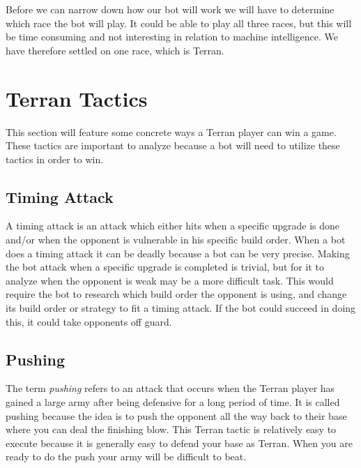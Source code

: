 Before we can narrow down how our bot will work we will have to determine which race the bot will play. It could be able to play all three races, but 
this will be time consuming and not interesting in relation to machine intelligence. We have therefore settled on one race, which is Terran.

\section{Terran Tactics}
	This section will feature some concrete ways a Terran player can win a game. 
	These tactics are important to analyze because a bot will need to utilize these tactics in order to win.
	
	\subsection{Timing Attack}
		A timing attack is an attack which either hits when a specific upgrade is done and/or when the opponent is vulnerable in his specific build order. 
		When a bot does a timing attack it can be deadly because a bot can be very precise. 
		Making the bot attack when a specific upgrade is completed is trivial, but for it to 
		analyze when the opponent is weak may be a more difficult task. 
		This would require the bot to research which build order the opponent is using, and change its build order or strategy to fit a timing attack. 
		If the bot could succeed in doing this, it could take opponents off guard.
		
	\subsection{Pushing}
		The term \textit{pushing} refers to an attack that occurs when the Terran player has gained a large army after being defensive for a long 
		period of time. It is called pushing because the idea is to push the opponent 
		all the way back to their base where you can deal the finishing blow. This Terran tactic is relatively easy to execute because it is generally
		easy to defend your base as Terran. When you are ready to do the push your army will be difficult to beat.
		
